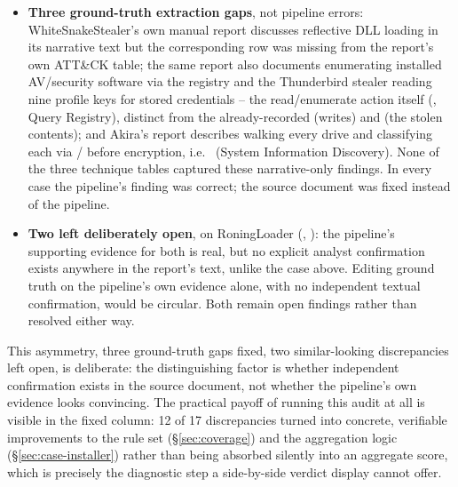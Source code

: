 \begin{itemize}
    import/string from corroboration in either direction. Unlike that
    case, the underlying evidence here is real (both binaries do
    import these functions), just not specific enough to confirm the
    claimed technique, so the finding remains present post-fix at its
    now-honest \emph{medium}/\emph{low} confidence rather than
    disappearing outright -- a direct illustration of the
    confidence/precision relationship examined in
    \S\ref{sec:confidence-calibration}, not a counterexample to it.
  \item \textbf{Three ground-truth extraction gaps}, not pipeline
    errors: WhiteSnakeStealer's own manual report discusses reflective
    DLL loading in its narrative text but the corresponding
     row was missing from the report's own ATT\&CK
    table; the same report also documents  enumerating
    installed AV/security software via the registry and the
    Thunderbird stealer reading nine profile keys for stored
    credentials -- the read/enumerate action itself
    (, Query Registry), distinct from the
    already-recorded  (writes) and
     (the stolen contents); and Akira's report
    describes  walking every drive and
    classifying each via /
    before encryption, i.e.\  (System Information
    Discovery). None of the three technique tables captured these
    narrative-only findings. In every case the pipeline's finding was
    correct; the source document was fixed instead of the pipeline.
  \item \textbf{Two left deliberately open}, on RoningLoader
    (, ): the pipeline's supporting
    evidence for both is real, but no explicit analyst confirmation
    exists anywhere in the report's text, unlike the
     case above. Editing ground truth on the
    pipeline's own evidence alone, with no independent textual
    confirmation, would be circular. Both remain open findings rather
    than resolved either way.
\end{itemize}

This asymmetry, three ground-truth gaps fixed, two similar-looking
discrepancies left open, is deliberate: the distinguishing factor is
whether independent confirmation exists in the source document, not
whether the pipeline's own evidence looks convincing. The practical
payoff of running this audit at all is visible in the fixed column: 12
of 17 discrepancies turned into concrete, verifiable improvements to
the rule set (\S\ref{sec:coverage}) and the aggregation logic
(\S\ref{sec:case-installer}) rather than being absorbed silently into
an aggregate score, which is precisely the diagnostic step a
side-by-side verdict display cannot offer.

